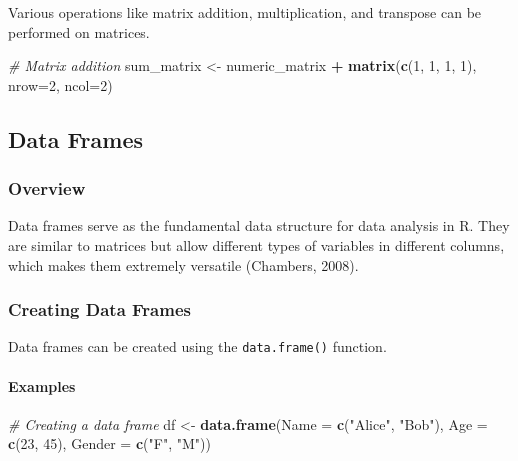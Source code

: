 \documentclass[
  b5paper]{book}
\newenvironment{Shaded}{\begin{snugshade}}{\end{snugshade}}
\newcommand{\AttributeTok}[1]{\textcolor[rgb]{0.13,0.29,0.53}{#1}}
\newcommand{\CommentTok}[1]{\textcolor[rgb]{0.56,0.35,0.01}{\textit{#1}}}
\newcommand{\DecValTok}[1]{\textcolor[rgb]{0.00,0.00,0.81}{#1}}
\newcommand{\FunctionTok}[1]{\textcolor[rgb]{0.13,0.29,0.53}{\textbf{#1}}}
\newcommand{\NormalTok}[1]{#1}
\newcommand{\OtherTok}[1]{\textcolor[rgb]{0.56,0.35,0.01}{#1}}
\newcommand{\SpecialCharTok}[1]{\textcolor[rgb]{0.81,0.36,0.00}{\textbf{#1}}}
\newcommand{\StringTok}[1]{\textcolor[rgb]{0.31,0.60,0.02}{#1}}
\begin{document}
Various operations like matrix addition, multiplication, and transpose can be performed on matrices.

\begin{Shaded}
\begin{Highlighting}[]
\CommentTok{\# Matrix addition}
\NormalTok{sum\_matrix }\OtherTok{\textless{}{-}}\NormalTok{ numeric\_matrix }\SpecialCharTok{+} \FunctionTok{matrix}\NormalTok{(}\FunctionTok{c}\NormalTok{(}\DecValTok{1}\NormalTok{, }\DecValTok{1}\NormalTok{, }\DecValTok{1}\NormalTok{, }\DecValTok{1}\NormalTok{), }\AttributeTok{nrow=}\DecValTok{2}\NormalTok{, }\AttributeTok{ncol=}\DecValTok{2}\NormalTok{)}
\end{Highlighting}
\end{Shaded}

\hypertarget{data-frames}{%
\subsection*{Data Frames}\label{data-frames}}

\hypertarget{overview-4}{%
\subsubsection*{Overview}\label{overview-4}}

Data frames serve as the fundamental data structure for data analysis in R. They are similar to matrices but allow different types of variables in different columns, which makes them extremely versatile (Chambers, 2008).

\hypertarget{creating-data-frames}{%
\subsubsection*{Creating Data Frames}\label{creating-data-frames}}

Data frames can be created using the \texttt{data.frame()} function.

\hypertarget{examples-4}{%
\paragraph*{Examples}\label{examples-4}}

\begin{Shaded}
\begin{Highlighting}[]
\CommentTok{\# Creating a data frame}
\NormalTok{df }\OtherTok{\textless{}{-}} \FunctionTok{data.frame}\NormalTok{(}\AttributeTok{Name =} \FunctionTok{c}\NormalTok{(}\StringTok{"Alice"}\NormalTok{, }\StringTok{"Bob"}\NormalTok{), }\AttributeTok{Age =} \FunctionTok{c}\NormalTok{(}\DecValTok{23}\NormalTok{, }\DecValTok{45}\NormalTok{), }\AttributeTok{Gender =} \FunctionTok{c}\NormalTok{(}\StringTok{"F"}\NormalTok{, }\StringTok{"M"}\NormalTok{))}
\end{Highlighting}
\end{Shaded}
\end{document}
